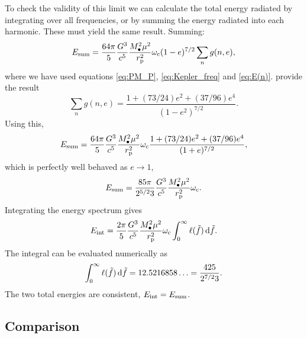 To check the validity of this limit we can calculate the total energy radiated by integrating  over all frequencies, or by summing the energy radiated into each harmonic. These must yield the same result. Summing:
\begin{equation}
E_\mathrm{sum} = \frac{64\pi}{5}\frac{G^3}{c^5}\frac{M_\bullet^2\mu^2}{r_\mathrm{p}^2}\omega_\mathrm{c}(1-e)^{7/2}\sum_n g(n,e),
\end{equation}
where we have used equations \eqref{eq:PM_P}, \eqref{eq:Kepler_freq} and \eqref{eq:E(n)}. \citet{Peters1963} provide the result
\begin{equation}
\sum_n g(n,e) = \frac{1 + (73/24)e^2 + (37/96)e^4}{(1-e^2)^{7/2}}.
\end{equation}
Using this,
\begin{equation}
E_\mathrm{sum} = \frac{64\pi}{5}\frac{G^3}{c^5}\frac{M_\bullet^2\mu^2}{r_\mathrm{p}^2}\omega_\mathrm{c}\frac{1 + (73/24)e^2 + (37/96)e^4}{(1+e)^{7/2}},
\end{equation}
which is perfectly well behaved as $e \rightarrow 1$,
\begin{equation}
E_\mathrm{sum} = \frac{85\pi}{2^{5/2}3}\frac{G^3}{c^5}\frac{M_\bullet^2\mu^2}{r_\mathrm{p}^2}\omega_\mathrm{c}.
\label{eq:PM_total}
\end{equation}
Integrating the energy spectrum  gives
\begin{equation}
E_\mathrm{int} = \frac{2\pi}{5}\frac{G^3}{c^5}\frac{M_\bullet^2\mu^2}{r_\mathrm{p}^2}\omega_\mathrm{c}\int_{0}^{\infty}{\ell(\tilde{f})}\,\mathrm{d}{\tilde{f}}.
\end{equation}
The integral can be evaluated numerically as
\begin{equation}
\int_{0}^{\infty}{\ell(\tilde{f})}\,\mathrm{d}{\tilde{f}} = 12.5216858\ldots = \frac{425}{2^{7/2}3}.
\end{equation}
The two total energies are consistent, $E_\mathrm{int} = E_\mathrm{sum}$.

\subsection{Comparison}


